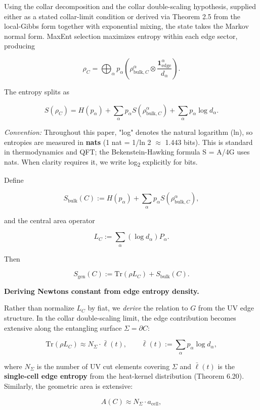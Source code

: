 Using the collar decomposition and the collar double-scaling hypothesis, supplied either as a stated collar-limit condition or derived via Theorem 2.5 from the local-Gibbs form together with exponential mixing, the state takes the Markov normal form. MaxEnt selection maximizes entropy within each edge sector, producing

\[
\rho_C = \bigoplus_{\alpha} p_{\alpha}
\left(\rho_{\mathrm{bulk},C}^{\alpha} \otimes \frac{\mathbf 1_{\mathrm{edge}}^{\alpha}}{d_{\alpha}}\right).
\]

The entropy splits as

\[
S(\rho_C) = H(p_{\alpha}) + \sum_{\alpha} p_{\alpha} S(\rho_{\mathrm{bulk},C}^{\alpha}) + \sum_{\alpha} p_{\alpha} \log d_{\alpha}.
\]

\emph{Convention:} Throughout this paper, "log" denotes the natural logarithm (ln), so entropies are measured in \textbf{nats} (1 nat = 1/ln 2 \ensuremath{\approx} 1.443 bits). This is standard in thermodynamics and QFT; the Bekenstein-Hawking formula S = A/4G uses nats. When clarity requires it, we write log\textsubscript{2} explicitly for bits.

Define

\[
S_{\mathrm{bulk}}(C) := H(p_{\alpha}) + \sum_{\alpha} p_{\alpha} S(\rho_{\mathrm{bulk},C}^{\alpha}),
\]

and the central area operator

\[
L_C := \sum_{\alpha} (\log d_{\alpha}) P_{\alpha}.
\]

Then

\[
S_{\mathrm{gen}}(C) := \mathrm{Tr}(\rho L_C) + S_{\mathrm{bulk}}(C).
\]

\textbf{Deriving Newton\textquotesingle s constant from edge entropy density.}

Rather than normalize \(L_C\) by fiat, we \emph{derive} the relation to \(G\) from the UV edge structure. In the collar double-scaling limit, the edge contribution becomes extensive along the entangling surface \(\Sigma = \partial C\):

\[
\mathrm{Tr}(\rho L_C) \approx N_\Sigma \cdot \bar{\ell}(t),
\qquad
\bar{\ell}(t) := \sum_\alpha p_\alpha \log d_\alpha,
\]

where \(N_\Sigma\) is the number of UV cut elements covering \(\Sigma\) and \(\bar{\ell}(t)\) is the \textbf{single-cell edge entropy} from the heat-kernel distribution (Theorem 6.20). Similarly, the geometric area is extensive:

\[
A(C) \approx N_\Sigma \cdot a_{\mathrm{cell}},
\]

